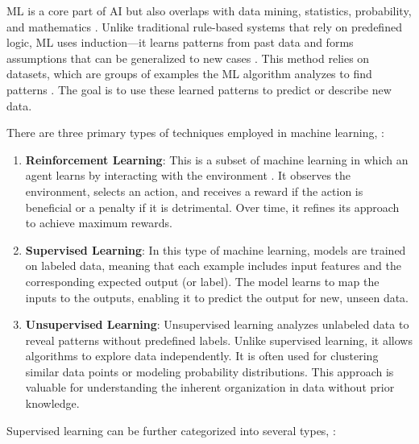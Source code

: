 \gls{ML} is a core part of \gls{AI} but also overlaps with data mining, statistics, probability, and mathematics \parencite{Mohri2012}. 
Unlike traditional rule-based systems that rely on predefined logic, \gls{ML} uses induction—it learns patterns from past data and forms assumptions that can be generalized to new cases \parencite{Ali2024}. 
This method relies on datasets, which are groups of examples the \gls{ML} algorithm analyzes to find patterns \parencite{Mohri2012, Suthaharan2016}. 
The goal is to use these learned patterns to predict or describe new data.

There are three primary types of techniques employed in machine learning, \parencite{Mohri2012}:

\begin{enumerate}
    \item \textbf{Reinforcement Learning}: 
    This is a subset of machine learning in which an agent learns by interacting with the environment \parencite{Moradi2023}. It observes the environment, selects an action, and receives a reward if the action is beneficial or a penalty if it is detrimental. Over time, it refines its approach to achieve maximum rewards.

    \item \textbf{Supervised Learning}: 
    In this type of machine learning, models are trained on labeled data, meaning that each example includes input features and the corresponding expected output (or label). The model learns to map the inputs to the outputs, enabling it to predict the output for new, unseen data.

    \item \textbf{Unsupervised Learning}: 
    Unsupervised learning analyzes unlabeled data to reveal patterns without predefined labels. Unlike supervised learning, it allows algorithms to explore data independently. It is often used for clustering similar data points or modeling probability distributions. This approach is valuable for understanding the inherent organization in data without prior knowledge.
\end{enumerate}

Supervised learning can be further categorized into several types, \parencite{Mohri2012}:

